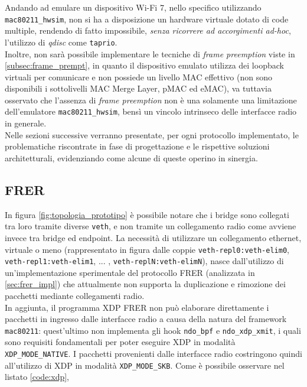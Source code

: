 \documentclass[12pt,a4paper,twoside]{book}
\newcommand{\hwsim}{\mbox{\texttt{mac80211\_hwsim}}\xspace}
\begin{document}
\begin{onehalfspace}
Andando ad emulare un dispositivo Wi-Fi 7, nello specifico utilizzando \hwsim, non si ha a disposizione un hardware virtuale dotato di code multiple, rendendo di fatto impossibile, \textit{senza ricorrere ad accorgimenti ad-hoc}, l'utilizzo di \textit{qdisc} come \texttt{taprio}.
\\
Inoltre, non sarà possibile implementare le tecniche di \textit{frame preemption} viste in \ref{subsec:frame_prempt}, in quanto il dispositivo emulato utilizza dei loopback virtuali per comunicare e non possiede un livello MAC effettivo (non sono disponibili i sottolivelli MAC Merge Layer, pMAC ed eMAC), va tuttavia osservato che l'assenza di \textit{frame preemption} non è una solamente una limitazione dell'emulatore \hwsim, bensì un vincolo intrinseco delle interfacce radio in generale.
\\
Nelle sezioni successive verranno presentate, per ogni protocollo implementato, le problematiche riscontrate in fase di progettazione e le rispettive soluzioni architetturali, evidenziando come alcune di queste operino in sinergia.

\subsection{FRER}
In figura \ref{fig:topologia_prototipo} è possibile notare che i bridge sono collegati tra loro tramite diverse \texttt{veth}, e non tramite un collegamento radio come avviene invece tra bridge ed endpoint. La necessità di utilizzare un collegamento ethernet, virtuale o meno (rappresentato in figura dalle coppie \texttt{veth-repl0:veth-elim0}, \texttt{veth-repl1:veth-elim1}, ... , \texttt{veth-replN:veth-elimN}), nasce dall'utilizzo di un'implementazione sperimentale del protocollo FRER (analizzata in \ref{sec:frer_impl}) che attualmente non supporta la duplicazione e rimozione dei pacchetti mediante collegamenti radio.  
\\
In aggiunta, il programma XDP FRER non può elaborare direttamente i pacchetti in ingresso dalle interfacce radio a causa della natura del framework \texttt{mac80211}: quest'ultimo non implementa gli hook \texttt{ndo\_bpf} e \texttt{ndo\_xdp\_xmit}, i quali sono requisiti fondamentali per poter eseguire XDP in modalità \texttt{XDP\_MODE\_NATIVE}. I pacchetti provenienti dalle interfacce radio costringono quindi all'utilizzo di XDP in modalità \texttt{XDP\_MODE\_SKB}. 
Come è possibile osservare nel listato \ref{code:xdp},


\end{onehalfspace}
\end{document}
